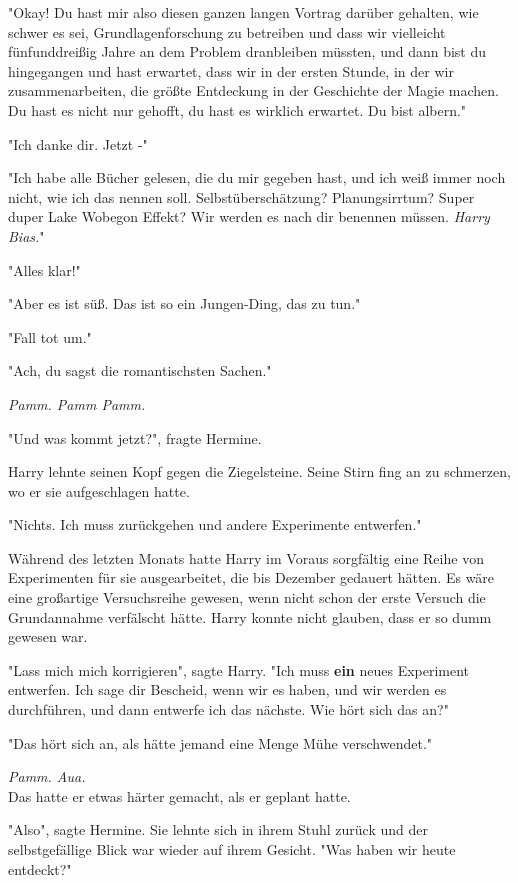 {"Okay! Du hast mir also diesen ganzen langen Vortrag darüber gehalten, wie schwer es sei, Grundlagenforschung zu betreiben und dass wir vielleicht fünfunddreißig Jahre an dem Problem dranbleiben müssten, und dann bist du hingegangen und hast erwartet, dass wir in der ersten Stunde, in der wir zusammenarbeiten, die größte Entdeckung in der Geschichte der Magie machen. Du hast es nicht nur gehofft, du hast es wirklich erwartet. Du bist albern."

"Ich danke dir. Jetzt -"

"Ich habe alle Bücher gelesen, die du mir gegeben hast, und ich weiß immer noch nicht, wie ich das nennen soll. Selbstüberschätzung? Planungsirrtum? Super duper Lake Wobegon Effekt? Wir werden es nach dir benennen müssen. \emph{Harry Bias.}"

"Alles klar!"

"Aber es ist süß. Das ist so ein Jungen-Ding, das zu tun."

"Fall tot um."

"Ach, du sagst die romantischsten Sachen."

\emph{Pamm. Pamm Pamm.}

"Und was kommt jetzt?", fragte Hermine.

Harry lehnte seinen Kopf gegen die Ziegelsteine. Seine Stirn fing an zu schmerzen, wo er sie aufgeschlagen hatte.

"Nichts. Ich muss zurückgehen und andere Experimente entwerfen."

Während des letzten Monats hatte Harry im Voraus sorgfältig eine Reihe von Experimenten für sie ausgearbeitet, die bis Dezember gedauert hätten. Es wäre eine großartige Versuchsreihe gewesen, wenn nicht schon der erste Versuch die Grundannahme verfälscht hätte. Harry konnte nicht glauben, dass er so dumm gewesen war.

"Lass mich mich korrigieren", sagte Harry. "Ich muss \textbf{ein} neues Experiment entwerfen. Ich sage dir Bescheid, wenn wir es haben, und wir werden es durchführen, und dann entwerfe ich das nächste. Wie hört sich das an?"

"Das hört sich an, als hätte jemand eine Menge Mühe verschwendet."

\emph{Pamm. Aua.}\\ Das hatte er etwas härter gemacht, als er geplant hatte.

"Also", sagte Hermine. Sie lehnte sich in ihrem Stuhl zurück und der selbstgefällige Blick war wieder auf ihrem Gesicht. "Was haben wir heute entdeckt?"

}
